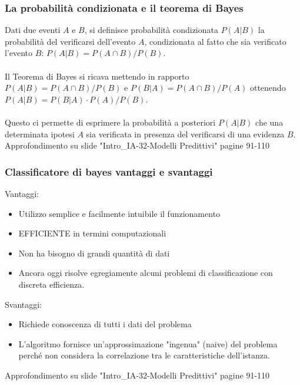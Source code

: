 \documentclass[../main.tex]{subfiles}
\begin{document}
	\subsubsection{La probabilità condizionata e il teorema di Bayes}
	Dati due eventi $A$ e $B$, si definisce probabilità condizionata $P(A \vert B)$ la probabilità del verificarsi dell'evento $A$, condizionata al fatto che sia verificato l'evento $B$: $P(A \vert B)=P(A \cap B)/P(B)$.\\\\
	Il Teorema di Bayes si ricava mettendo in rapporto $P(A \vert B)=P(A \cap B)/P(B)$ e $P(B \vert A)=P(A \cap B)/P(A)$ ottenendo $P(A \vert B)=P(B \vert A) \cdot P(A)/P(B)$.\\\\
	Questo ci permette di esprimere la probabilità a posteriori $P(A \vert B)$ che una determinata ipotesi $A$ sia verificata in presenza del verificarsi di una evidenza $B$.\\
	{\color{red}Approfondimento su slide "Intro\_IA-32-Modelli Predittivi" pagine 91-110}
	\subsubsection{Classificatore di bayes vantaggi e svantaggi}
	Vantaggi: 
	\begin{itemize}
		\item Utilizzo semplice e facilmente intuibile il funzionamento
		\item EFFICIENTE in termini computazionali
		\item Non ha bisogno di grandi quantità di dati
		\item Ancora oggi risolve egregiamente alcuni problemi di classificazione con discreta efficienza.
	\end{itemize}
	Svantaggi: 
	\begin{itemize}
		\item Richiede conoscenza di tutti i dati del problema
		\item L'algoritmo fornisce un'approssimazione "ingenua" (naive) del problema perché non considera la correlazione tra le caratteristiche dell'istanza.
	\end{itemize}
	{\color{red}Approfondimento su slide "Intro\_IA-32-Modelli Predittivi" pagine 91-110}
\end{document}
